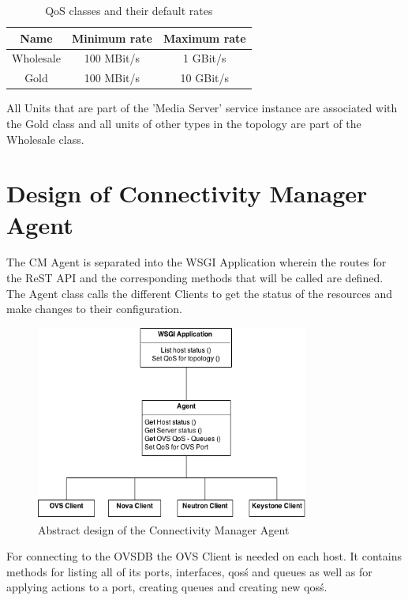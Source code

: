 \begin{table}[H]
\centering

\begin{tabular}{|c|c|c|}
\hline \textbf{Name} & Minimum rate & Maximum rate \\ 
\hline Wholesale & 100 MBit/s & 1 GBit/s \\ 
\hline Gold & 100 MBit/s & 10 GBit/s \\ 
\hline 
\end{tabular} 

\caption{QoS classes and their default rates}
\end{table}


All Units that are part of the 'Media Server' service instance are associated with the Gold class and all units of other types in the topology are part of the Wholesale class.


\newpage
\section{Design of Connectivity Manager Agent}

The CM Agent is separated into the WSGI Application wherein the routes for the ReST API and the corresponding methods that will be called are defined. The Agent class calls the different Clients to get the status of the resources and make changes to their configuration.

\begin{figure}[H]
\centering

\includegraphics[width=0.8\textwidth]{images/design/cm_agent_design_class_diagram.png}

\caption{Abstract design of the Connectivity Manager Agent}
\end{figure}

For connecting to the OVSDB the OVS Client is needed on each host. It contains methods for listing all of its ports, interfaces, qos\'s and queues as well as for applying actions to a port, creating queues and creating new qos\'s.

